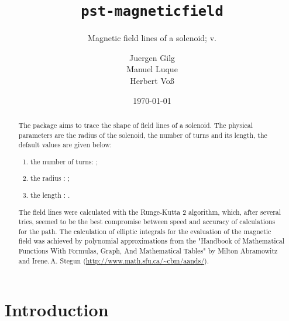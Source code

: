 \documentclass[11pt,english,BCOR10mm,DIV12,bibliography=totoc,parskip=false,smallheadings
    headexclude,footexclude,oneside]{pst-doc}
\let\pstMFfv\fileversion
\begin{document}
\title{\texttt{pst-magneticfield}}
\subtitle{Magnetic field lines of a solenoid; v.\pstMFfv}
\author{Juergen Gilg\\ Manuel Luque\\Herbert Vo\ss}
\date{\today}
\maketitle


\clearpage%
\begin{abstract}
The package  aims to trace the shape of field lines
of a solenoid. The physical parameters are the radius of the solenoid, the number of
turns and its length, the default values are given below:

\begin{enumerate}
  \item the number of turns:  ;
  \item the radius :  ;
  \item the length : .
\end{enumerate}

The field lines were calculated with the Runge-Kutta 2 algorithm, which, after several tries, 
seemed to be the best compromise between speed and accuracy of calculations for the path.
The calculation of elliptic integrals for the evaluation of the magnetic field
was achieved by polynomial approximations from the "Handbook of Mathematical
Functions With Formulas, Graph, And Mathematical Tables" by Milton Abramowitz and
Irene.\,A. Stegun (\url{http://www.math.sfu.ca/~cbm/aands/}).~\cite{abramowitz}
\end{abstract}

\clearpage
\tableofcontents


\clearpage

\section{Introduction}
\end{document}
